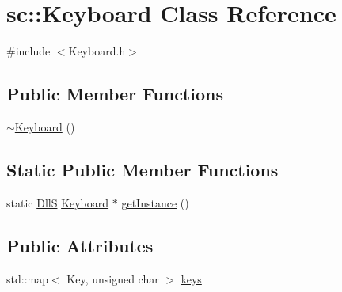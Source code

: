 \hypertarget{classsc_1_1_keyboard}{}\section{sc\+::Keyboard Class Reference}
\label{classsc_1_1_keyboard}


{\ttfamily \#include $<$Keyboard.\+h$>$}

\subsection*{Public Member Functions}
\begin{DoxyCompactItemize}
\item 
\mbox{\hyperlink{classsc_1_1_keyboard_af6a99ec66c8c722a45b967bf79167038}{$\sim$\+Keyboard}} ()
\end{DoxyCompactItemize}
\subsection*{Static Public Member Functions}
\begin{DoxyCompactItemize}
\item 
static \mbox{\hyperlink{_single_test_8h_ac612533c84ec9f58274935ca41422bc2}{DllS}} \mbox{\hyperlink{classsc_1_1_keyboard}{Keyboard}} $\ast$ \mbox{\hyperlink{classsc_1_1_keyboard_ae1c7c6d408d7c26a48ba96ed2f114c6a}{get\+Instance}} ()
\end{DoxyCompactItemize}
\subsection*{Public Attributes}
\begin{DoxyCompactItemize}
\item 
std\+::map$<$ Key, unsigned char $>$ \mbox{\hyperlink{classsc_1_1_keyboard_a58a24371543a41a11455d0d199a2135e}{keys}}
\end{DoxyCompactItemize}
